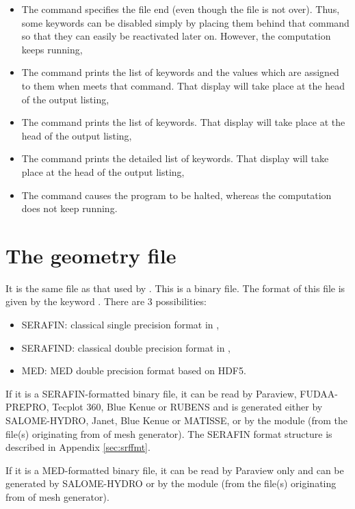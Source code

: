 \begin{itemize}
\item The  command specifies the file end (even though the
file is not over). Thus, some keywords can be disabled simply by placing them
behind that command so that they can easily be reactivated later on. However,
the computation keeps running,

\item The  command prints the list of keywords and the
values which are assigned to them when  meets that command.
That display will take place at the head of the output listing,

\item The  command prints the list of keywords. That
display will take place at the head of the output listing,

\item The  command prints the detailed list of keywords.
That display will take place at the head of the output listing,

\item The  command causes the program to be halted, whereas
the computation does not keep running.
\end{itemize}

\section{The geometry file}

It is the same file as that used by .
This is a binary file.
The format of this file is given by the keyword .
There are 3 possibilities:
\begin{itemize}
\item SERAFIN: classical single precision format in \tel,
\item SERAFIND: classical double precision format in \tel,
\item MED: MED double precision format based on HDF5.
\end{itemize}

If it is a SERAFIN-formatted binary file, it can be read by
Paraview, FUDAA-PREPRO, Tecplot 360, Blue Kenue or RUBENS
and is generated either by SALOME-HYDRO, Janet, Blue Kenue or MATISSE,
or by the \stbtel module (from the file(s) originating from of mesh generator).
The SERAFIN format structure is described in Appendix \ref{sec:srffmt}.

If it is a MED-formatted binary file, it can be read by
Paraview only and can be generated by SALOME-HYDRO
or by the \stbtel module (from the file(s) originating from of mesh generator).

